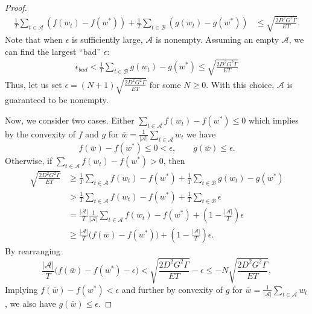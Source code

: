 \documentclass{article} %
\def\A{{\mathcal A}}
\def\B{{\mathcal B}}
\begin{document}
\begin{proof}
\begin{equation*}
    \begin{aligned}
        \frac{1}{T}\sum_{t\in \A}(f(w_t) - f(w^*) ) + \frac{1}{T}\sum_{t\in \B}(g(w_t) - g(w^*)) &\leq \sqrt{\frac{{2 D^2 G^2 \Gamma}}{{E T}}}.
    \end{aligned}
\end{equation*}
Note that when $\epsilon$ is sufficiently large, $\A$ is nonempty. Assuming an empty $\A$, we can find the largest ``bad'' $\epsilon$:
\begin{align}
    \nonumber
    \epsilon_{bad} < \frac{1}{T} \sum_{t\in \B}g(w_t) - g(w^*) \leq \sqrt{\frac{{2 D^2 G^2 \Gamma}}{{E T}}}
\end{align}
Thus, let us set $\epsilon = (N+1) \sqrt{\frac{{2 D^2 G^2 \Gamma}}{{E T}}} $ for some $N\geq 0$. With this choice, $\A$ is guaranteed to be nonempty.

Now, we consider two cases. Either $\sum_{t\in \A} f(w_t)-f(w^*) \leq 0$ which implies by the convexity of $f$ and $g$ for $\bar{w} = \frac{1}{|\A|} \sum_{t\in \A} w_t$ we have
\begin{equation}
    \label{eq:fedsgm_result1}
  f(\bar{w})-f(w^*) \leq 0 <\epsilon,\qquad  g(\bar{w})\leq \epsilon.
\end{equation}
Otherwise, if $\sum_{t\in \A} f(w_t)-f(w^*) >0$, then
    \begin{equation}\label{eq:fedsgm_cvx_che}
        \begin{aligned}
          \sqrt{\frac{{2 D^2 G^2 \Gamma}}{{E T}}}  &\geq \frac{1}{T} \sum_{t\in \A} f(w_t)-f(w^*) +\frac{1}{T} \sum_{t\in \B} g(w_t)-g(w^*)\\&>\frac{1}{T} \sum_{t\in \A} f(w_t)-f(w^*) +\frac{1}{T} \sum_{t\in \B} \epsilon\\&=\frac{|\A|}{T}  \frac{1}{|\A|}\sum_{t\in \A} f(w_t)-f(w^*) +(1-\frac{|\A|}{T}) \epsilon\\&\geq\frac{|\A|}{T} \big( f(\bar{w})-f(w^*) \big)+(1-\frac{|\A|}{T}) \epsilon .
        \end{aligned}
    \end{equation}
    By rearranging
\begin{equation}
  \frac{|\A|}{T}  \Big(f(\bar{w})-f(w^*)-\epsilon\Big)  <\sqrt{\frac{{2 D^2 G^2 \Gamma}}{{E T}}} -\epsilon \leq -N\sqrt{\frac{{2 D^2 G^2 \Gamma}}{{E T}}},
\end{equation}
Implying $f(\bar{w})-f(w^*)<\epsilon$ and further by convexity of $g$ for $\bar{w} = \frac{1}{|\A|} \sum_{t\in \A} w_t$, we also have $g(\bar{w})\leq\epsilon$. 
\end{proof}
\end{document}
